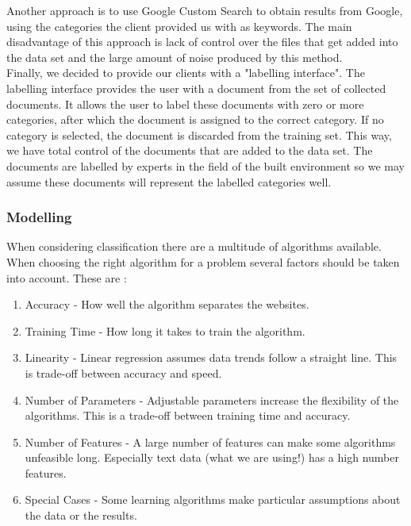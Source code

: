 Another approach is to use Google Custom Search to obtain results from Google, using the categories the client provided us with as keywords. The main disadvantage of this approach is lack of control over the files that get added into the data set and  the large amount of noise produced by this method.\\

Finally, we decided to provide our clients with a "labelling interface". The labelling interface provides the user with a document from the set of collected documents. It allows the user to label these documents with zero or more categories, after which the document is assigned to the correct category. If no category is selected, the document is discarded from the training set. This way, we have total control of the documents that are added to the data set. The documents are labelled by experts in the field of the built environment so we may assume these documents will represent the labelled categories well. 

\subsubsection{Modelling}
When considering classification there are a multitude of algorithms available. When choosing the right algorithm for a problem several factors should be taken into account. These are \cite{MLCheatSheet}:
    \begin{enumerate}
        \item Accuracy - How well the algorithm separates the websites.
        \item Training Time - How long it takes to train the algorithm.
        \item Linearity - Linear regression assumes data trends follow a straight line. This is trade-off between accuracy and speed.
        \item Number of Parameters - Adjustable parameters increase the flexibility of the algorithms. This is a trade-off between training time and accuracy.
        \item Number of Features - A large number of features can make some algorithms unfeasible long. Especially text data (what we are using!) has a high number features.
        \item Special Cases - Some learning algorithms make particular assumptions about the data or the results.
    \end{enumerate}


